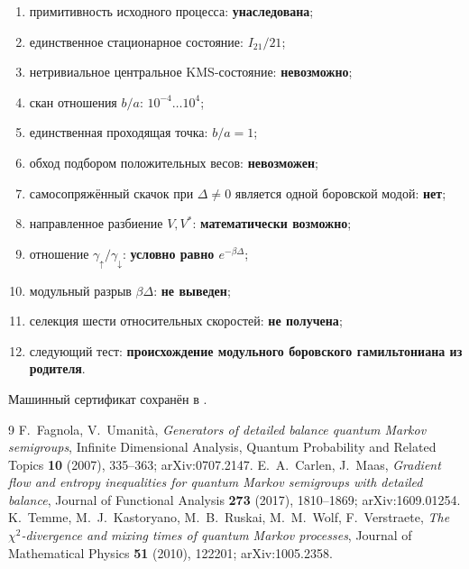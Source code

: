 \begin{protocol}
\begin{enumerate}
 \item примитивность исходного процесса: \textbf{унаследована};
 \item единственное стационарное состояние: \textbf{$I_{21}/21$};
 \item нетривиальное центральное KMS-состояние: \textbf{невозможно};
 \item скан отношения $b/a$: \textbf{$10^{-4}\ldots10^4$};
 \item единственная проходящая точка: \textbf{$b/a=1$};
 \item обход подбором положительных весов: \textbf{невозможен};
 \item самосопряжённый скачок при $\Delta\neq0$ является одной боровской
 модой: \textbf{нет};
 \item направленное разбиение $V,V^*$: \textbf{математически возможно};
 \item отношение $\gamma_\uparrow/\gamma_\downarrow$: \textbf{условно
 равно $e^{-\beta\Delta}$};
 \item модульный разрыв $\beta\Delta$: \textbf{не выведен};
 \item селекция шести относительных скоростей: \textbf{не получена};
 \item следующий тест: \textbf{происхождение модульного боровского
 гамильтониана из родителя}.
\end{enumerate}
\end{protocol}

Машинный сертификат сохранён в
.

\begin{thebibliography}{9}
F.~Fagnola, V.~Umanit\`a,
\emph{Generators of detailed balance quantum Markov semigroups},
Infinite Dimensional Analysis, Quantum Probability and Related Topics
\textbf{10} (2007), 335--363; arXiv:0707.2147.
E.~A.~Carlen, J.~Maas,
\emph{Gradient flow and entropy inequalities for quantum Markov semigroups
with detailed balance}, Journal of Functional Analysis \textbf{273}
(2017), 1810--1869; arXiv:1609.01254.
K.~Temme, M.~J.~Kastoryano, M.~B.~Ruskai, M.~M.~Wolf, F.~Verstraete,
\emph{The $\chi^2$-divergence and mixing times of quantum Markov
processes}, Journal of Mathematical Physics \textbf{51} (2010), 122201;
arXiv:1005.2358.
\end{thebibliography}